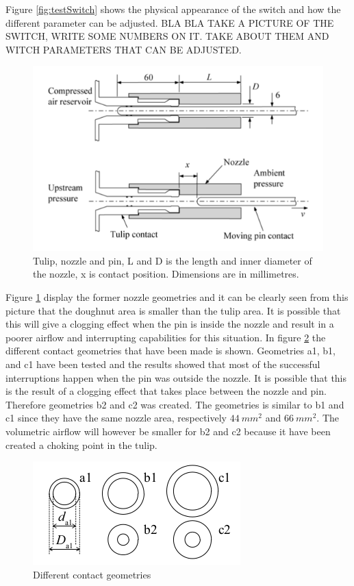 \documentclass[10pt,a4paper]{article} %
\begin{document}
Figure \ref{fig:testSwitch} shows the physical appearance of the switch and how the different parameter can be adjusted. BLA BLA TAKE A PICTURE OF THE SWITCH, WRITE SOME NUMBERS ON IT. TAKE ABOUT THEM AND WITCH PARAMETERS THAT CAN BE ADJUSTED.

\begin{figure} [h]
\centering
\includegraphics[scale=0.5]{Bilder/Theory/SchematicTestSwitch.png}
\caption{Tulip, nozzle and pin, L and D is the length and inner diameter of the nozzle, x is contact position. Dimensions are in millimetres.   \cite{bib:CIAMVLBS}} \label{fig:SchematicTestSwitch}
\end{figure}

Figure \ref{fig:SchematicTestSwitch} display the former nozzle geometries and it can be clearly seen from this picture that the doughnut area is smaller than the tulip area. It is possible that this will give a clogging effect when the pin is inside the nozzle and result in a poorer airflow and interrupting capabilities for this situation. In figure \ref{fig:differentGeometries} the different contact geometries that have been made is shown. Geometries a1, b1, and c1 have been tested and the results showed that most of the successful interruptions happen when the pin was outside the nozzle. It is possible that this is the result of a clogging effect that takes place between the nozzle and pin. Therefore geometries b2 and c2 was created. The geometries is similar to b1 and c1 since they have the same nozzle area, respectively $44 \ mm^2$ and $66 \ mm^2$. The volumetric airflow will however be smaller for b2 and c2 because it have been created a choking point in the tulip. 

\begin{figure} [h]
\centering
\includegraphics[scale=0.6]{Bilder/Theory/differentGeometries.png}
\caption{Different contact geometries \cite{bib:CIAMVLBS}} \label{fig:differentGeometries}
\end{figure}
\end{document}

